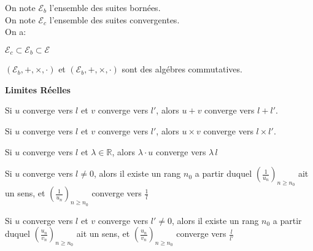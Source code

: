 \documentclass[12pt,twoside,a4paper]{article}
\begin{document}
		\begin{prop}
			On note $\mathcal{E}_b$ l'ensemble des suites born\'ees.\\
			On note $\mathcal{E}_c$ l'ensemble des suites convergentes.\\
			On a:
			\begin{liste}
				\item$\mathcal{E}_c\subset\mathcal{E}_b\subset\mathcal{E}$
				\item$(\mathcal{E}_b,+,\times,\cdot)$ et $(\mathcal{E}_b,+,\times,\cdot)$ sont des alg\'ebres commutatives.
			\end{liste}
		\end{prop}
		\begin{flushleft}
			\textbf{Limites R\'eelles}
		\end{flushleft}
		\begin{prop}
			\begin{liste}
				\item Si $u$ converge vers $l$ et $v$ converge vers $l'$, alors $u+v$ converge vers $l+l'$.
				\item Si $u$ converge vers $l$ et $v$ converge vers $l'$, alors $u\times v$ converge vers $l\times l'$.
				\item Si $u$ converge vers $l$ et $\lambda\in\mathbb{R}$, alors $\lambda\cdot u$ converge vers $\lambda\,l$
				\item Si $u$ converge vers $l\neq0$, alors il existe un rang $n_0$ a partir duquel $\left(\frac{1}{u_n}\right)_{n\geq n_0}$ ait un sens, et $\left(\frac{1}{u_n}\right)_{n\geq n_0}$ converge vers $\frac{1}{l}$
				\item Si $u$ converge vers $l$ et $v$ converge vers $l'\neq0$, alors il existe un rang $n_0$ a partir duquel $\left(\frac{u_n}{v_n}\right)_{n\geq n_0}$ ait un sens, et $\left(\frac{u_n}{v_n}\right)_{n\geq n_0}$ converge vers $\frac{l}{l'}$
			\end{liste}
		\end{prop}
\end{document}
